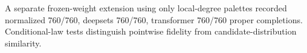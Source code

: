 A separate frozen-weight extension using only local-degree palettes recorded normalized 760/760, deepsets 760/760, transformer 760/760 proper completions. Conditional-law tests distinguish pointwise fidelity from candidate-distribution similarity.
